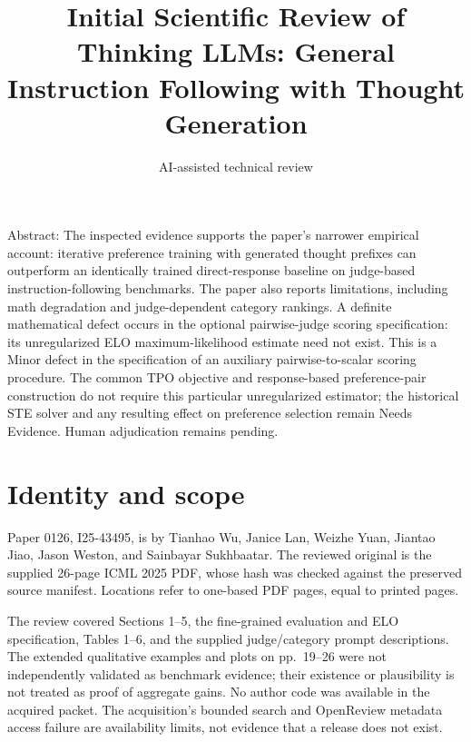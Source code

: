 \documentclass[10pt]{article}
\title{Initial Scientific Review of
Thinking LLMs: General Instruction Following
with Thought Generation}
\author{AI-assisted technical review}
\date{}
\begin{document}
\maketitle
Abstract: The inspected evidence supports the paper’s narrower empirical account: iterative preference training with generated thought prefixes can outperform an identically trained direct-response baseline on judge-based instruction-following benchmarks. The paper also reports limitations, including math degradation and judge-dependent category rankings. A definite mathematical defect occurs in the optional pairwise-judge scoring specification: its unregularized ELO maximum-likelihood estimate need not exist. This is a Minor defect in the specification of an auxiliary pairwise-to-scalar scoring procedure. The common TPO objective and response-based preference-pair construction do not require this particular unregularized estimator; the historical STE solver and any resulting effect on preference selection remain Needs Evidence. Human adjudication remains pending.\par
\section*{Identity and scope}
Paper 0126, I25-43495, is by Tianhao Wu, Janice Lan, Weizhe Yuan, Jiantao Jiao, Jason Weston, and Sainbayar Sukhbaatar. The reviewed original is the supplied 26-page ICML 2025 PDF, whose hash was checked against the preserved source manifest. Locations refer to one-based PDF pages, equal to printed pages.\par
The review covered Sections 1–5, the fine-grained evaluation and ELO specification, Tables 1–6, and the supplied judge/category prompt descriptions. The extended qualitative examples and plots on pp. 19–26 were not independently validated as benchmark evidence; their existence or plausibility is not treated as proof of aggregate gains. No author code was available in the acquired packet. The acquisition’s bounded search and OpenReview metadata access failure are availability limits, not evidence that a release does not exist.\par
\end{document}
